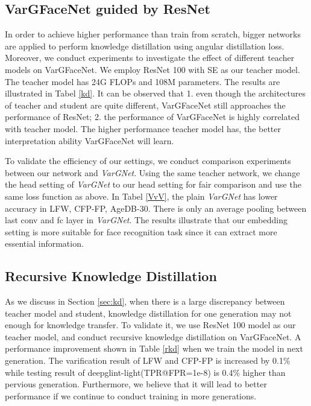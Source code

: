\documentclass[10pt,twocolumn,letterpaper]{article}
\begin{document}
\subsection{VarGFaceNet guided by ResNet}
\label{VgR}
In order to achieve higher performance than train from scratch, bigger networks are applied to perform knowledge distillation using angular distillation loss. Moreover, we conduct experiments to investigate the effect of different teacher models on VarGFaceNet. We employ ResNet 100 \cite{resnet} with SE as our teacher model. The teacher model has 24G FLOPs and 108M parameters. The results are illustrated in Tabel \ref{kd}. It can be observed that 1. even though the architectures of teacher and student are quite different, VarGFaceNet still approaches the performance of ResNet; 2.  the performance of VarGFaceNet is highly correlated with teacher model. The higher performance teacher model has, the better interpretation ability VarGFaceNet will learn.

To validate the efficiency of our settings, we conduct comparison experiments between our network and \textit{VarGNet}. Using the same teacher network, we change the head setting of \textit{VarGNet} to our head setting for fair comparison and use the same loss function as above. In Tabel \ref{VvV}, the plain \textit{VarGNet} has lower accuracy in LFW, CFP-FP, AgeDB-30. There is only an average pooling between last conv and fc layer in \textit{VarGNet}. The results illustrate that our embedding setting is more suitable for face recognition task since it can extract more essential information.

\subsection{Recursive Knowledge Distillation}
As we discuss in Section \ref{sec:kd}, when there is a large discrepancy between teacher model and student, knowledge distillation for one generation may not enough for knowledge transfer. To validate it, we use ResNet 100 model as our teacher model, and conduct recursive knowledge distillation on VarGFaceNet. A performance improvement shown in Table \ref{rkd} when we train the model in next generation. The varification result of LFW and CFP-FP is increased by 0.1\% while testing result of deepglint-light(TPR@FPR=1e-8) is 0.4\% higher than pervious generation. Furthermore, we believe that it will lead to better performance if we continue to conduct training in more generations.
\end{document}
